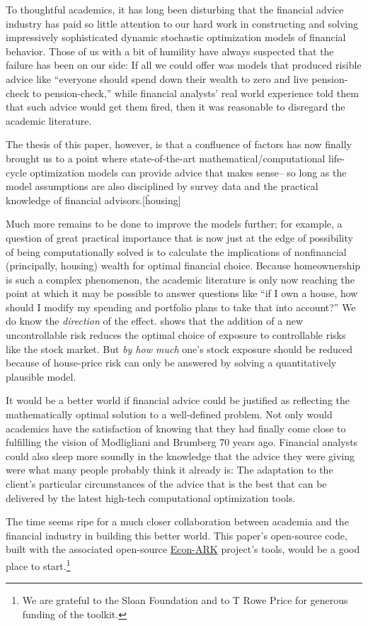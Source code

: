 \documentclass{article}
\begin{document}
To thoughtful academics, it has long been disturbing that the financial advice industry has paid so little attention to our hard work in constructing and solving impressively sophisticated dynamic stochastic optimization models of financial behavior.
Those of us with a bit of humility have always suspected that the failure has been on our side: If all we could offer was models that produced risible advice like ``everyone should spend down their wealth to zero and live pension-check to pension-check,'' while financial analysts' real world experience told them that such advice would get them fired, then it was reasonable to disregard the academic literature.

The thesis of this paper, however, is that a confluence of factors has now finally brought us to a point where state-of-the-art mathematical/computational life-cycle optimization models can provide advice that makes sense-- so long as the model assumptions are also disciplined by survey data and the practical knowledge of financial advisors.[\^housing]

Much more remains to be done to improve the models further; for example, a question of great practical importance that is now just at the edge of possibility of being computationally solved is to calculate the implications of nonfinancial (principally, housing) wealth for optimal financial choice.
Because homeownership is such a complex phenomenon, the academic literature is only now reaching the point at which it may be possible to answer questions like ``if I own a house, how should I modify my spending and portfolio plans to take that into account?''
We do know the \textit{direction} of the effect.
\cite{kimballStandardRA} shows that the addition of a new uncontrollable risk reduces the optimal choice of exposure to controllable risks like the stock market.
But \textit{by how much} one's stock exposure should be reduced because of house-price risk can only be answered by solving a quantitatively plausible model.

It would be a better world if financial advice could be justified as reflecting the mathematically optimal solution to a well-defined problem.
Not only would academics have the satisfaction of knowing that they had finally come close to fulfilling the vision of Modligliani and Brumberg 70 years ago.
Financial analysts could also sleep more soundly in the knowledge that the advice they were giving were what many people probably think it already is: The adaptation to the client's particular circumstances of the advice that is the best that can be delivered by the latest high-tech computational optimization tools.

The time seems ripe for a much closer collaboration between academia and the financial industry in building this better world.  This paper's open-source code, built with the associated open-source \href{https://econ-ark.org}{Econ-ARK} project's tools, would be a good place to start.\footnote{We are grateful to the Sloan Foundation and to T Rowe Price for generous funding of the toolkit.}






\end{document}
